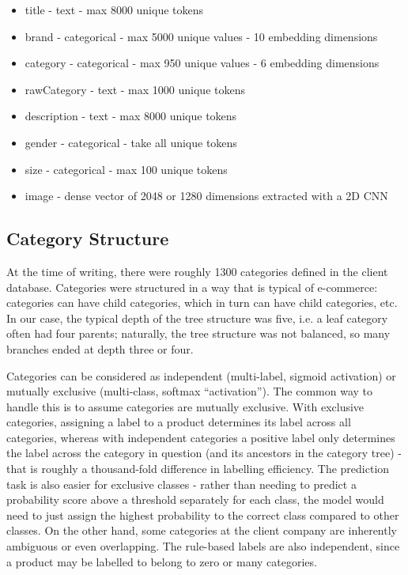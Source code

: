 \begin{itemize}[noitemsep]
  \item title - text - max 8000 unique tokens
  \item brand - categorical - max 5000 unique values - 10 embedding dimensions
  \item category - categorical - max 950 unique values - 6 embedding dimensions
  \item rawCategory - text - max 1000 unique tokens
  \item description - text - max 8000 unique tokens
  \item gender - categorical - take all unique tokens
  \item size - categorical - max 100 unique tokens
  \item image - dense vector of 2048 or 1280 dimensions extracted with a 2D CNN
\end{itemize}

\subsection{Category Structure}
\label{cat_tree}

At the time of writing, there were roughly 1300 categories defined in the client database.
Categories were structured in a way that is typical of  e-commerce:  categories can have  child categories, which in turn can have child categories, etc.
In our case, the typical depth of the tree structure was five, i.e. a leaf category often had four parents;  naturally, the tree structure was not balanced, so many branches ended at depth three or four.

Categories can be considered as independent (multi-label, sigmoid activation) or mutually exclusive (multi-class, softmax ``activation'').
The common way to handle this is to assume categories are mutually exclusive.
With exclusive categories, assigning a label to a product determines its label across all categories, whereas with independent categories a positive label only determines the label across the category in question (and its ancestors in the category tree) - that is roughly a thousand-fold difference in labelling efficiency.
The prediction task is also easier for exclusive classes - rather than needing to predict a probability score above a threshold separately for each class, the model would need to just assign the highest probability to the correct class compared to other classes.
On the other hand, some categories at the client company are inherently ambiguous or even overlapping.
The rule-based labels are also independent, since a product may be labelled to belong to zero or many categories.

